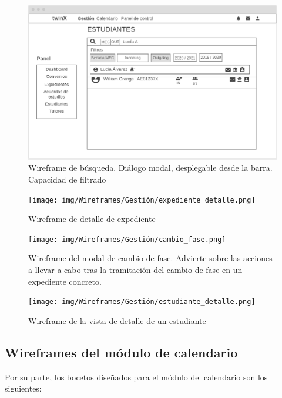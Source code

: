 \begin{figure}
	\centering
	\includegraphics[width=\textwidth]{img/Wireframes/Gestión/búsqueda.png}
	\caption[Wireframe de búsqueda]{Wireframe de búsqueda. Diálogo modal, desplegable desde la barra. Capacidad de filtrado}
	\label{fig:busquedaWF}
\end{figure}

\begin{figure}
	\centering
	\texttt{[image: img/Wireframes/Gestión/expediente\_detalle.png]}
	\caption{Wireframe de detalle de expediente}
	\label{fig:expediente_detalleWF}
\end{figure}

\begin{figure}
	\centering
	\texttt{[image: img/Wireframes/Gestión/cambio\_fase.png]}
	\caption[Wireframe del modal de cambio de fase]{Wireframe del modal de cambio de fase. Advierte sobre las acciones a llevar a cabo tras la tramitación del cambio de fase en un expediente concreto.}
	\label{fig:cambio_faseWF}
\end{figure}

\begin{figure}
	\centering
	\texttt{[image: img/Wireframes/Gestión/estudiante\_detalle.png]}
	\caption{Wireframe de la vista de detalle de un estudiante}
	\label{fig:estudiante_detalleWF}
\end{figure}

\newpage

\subsection{Wireframes del módulo de calendario}

Por su parte, los bocetos diseñados para el módulo del calendario son los siguientes:

